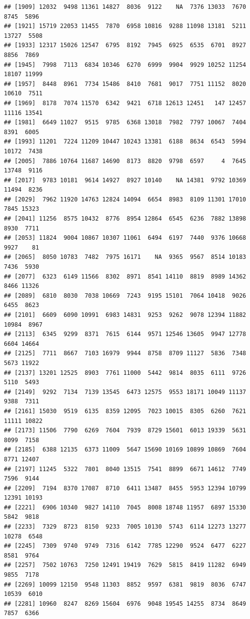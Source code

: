 \documentclass[
]{article}
\begin{document}
\begin{verbatim}
## [1909] 12032  9498 11361 14827  8036  9122    NA  7376 13033  7670  8745  5896
## [1921] 15719 22053 11455  7870  6958 10816  9288 11098 13181  5211 13727  5508
## [1933] 12317 15026 12547  6795  8192  7945  6925  6535  6701  8927  8856  7869
## [1945]  7998  7113  6834 10346  6270  6999  9904  9929 10252 11254 18107 11999
## [1957]  8448  8961  7734 15486  8410  7681  9017  7751 11152  8020 10610  7511
## [1969]  8178  7074 11570  6342  9421  6718 12613 12451   147 12457 11116 13541
## [1981]  6649 11027  9515  9785  6368 13018  7982  7797 10067  7404  8391  6005
## [1993] 11201  7224 11209 10447 10243 13381  6188  8634  6543  5994 10172  7438
## [2005]  7886 10764 11687 14690  8173  8820  9798  6597     4  7645 13748  9116
## [2017]  9783 10181  9614 14927  8927 10140    NA 14381  9792 10369 11494  8236
## [2029]  7962 11920 14763 12824 14094  6654  8983  8109 11301 17010  7845 15323
## [2041] 11256  8575 10432  8776  8954 12864  6545  6236  7882 13898  8930  7711
## [2053] 11824  9004 10867 10307 11061  6494  6197  7440  9376 10668  9927    81
## [2065]  8050 10783  7482  7975 16171    NA  9365  9567  8514 10183  7436  5930
## [2077]  6323  6149 11566  8302  8971  8541 14110  8819  8989 14362  8466 11326
## [2089]  6810  8030  7038 10669  7243  9195 15101  7064 10418  9026  6455  8623
## [2101]  6609  6090 10991  6983 14831  9253  9262  9078 12394 11882 10984  8967
## [2113]  6345  9299  8371  7615  6144  9571 12546 13605  9947 12778  6604 14664
## [2125]  7711  8667  7103 16979  9944  8758  8709 11127  5836  7348  5673 11922
## [2137] 13201 12525  8903  7761 11000  5442  9814  8035  6111  9726  5110  5493
## [2149]  9292  7134  7139 13545  6473 12575  9553 18171 10049 11137  9388  7311
## [2161] 15030  9519  6135  8359 12095  7023 10015  8305  6260  7621 11111 10822
## [2173] 11506  7790  6269  7604  7939  8729 15601  6013 19339  5631  8099  7158
## [2185]  6388 12135  6373 11009  5647 15690 10169 10899 10869  7604  8771 12407
## [2197] 11245  5322  7801  8040 13515  7541  8899  6671 14612  7749  7596  9144
## [2209]  7194  8370 17087  8710  6411 13487  8455  5953 12394 10799 12391 10193
## [2221]  6906 10340  9827 14110  7045  8008 18748 11957  6897 15330  5842  9818
## [2233]  7329  8723  8150  9233  7005 10130  5743  6114 12273 13277 10278  6548
## [2245]  7309  9740  9749  7316  6142  7785 12290  9524  6477  6227  8581  9764
## [2257]  7502 10763  7250 12491 19419  7629  5815  8419 11282  6949  9855  7178
## [2269] 10099 12150  9548 11303  8852  9597  6381  9819  8036  6747 10539  6010
## [2281] 10960  8247  8269 15604  6976  9048 19545 14255  8734  8649  7857  6366

\end{verbatim}
\end{document}
